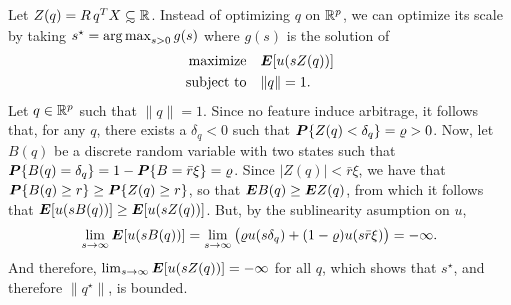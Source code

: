 Let $Z(q)=R\,q^TX\subsetsim\real$. Instead of optimizing $q$ on $\mathbb{R}^p$, we can optimize
its scale by taking $s^\star = \operatorname*{arg\,max}_{s>0}g(s)$ where $g(s)$ is the solution of
\begin{align*}
  \maximizeEquationSt{\E[u(sZ(q))]}[\|q\|= 1].
\end{align*}
Let $q\in\mathbb{R}^p$ such that $\|q\|=1$. Since no feature induce arbitrage, it follows that,
for any $q$, there exists a $\delta_q<0$ such that $\bm P\{Z(q)<\delta_q\}=\varrho>0$. Now,
let $B(q)$ be a discrete random variable with two states such that
$\bm P\{B(q)=\delta_q\}=1-\bm P\{B=\bar r\xi\}=\varrho$. Since $|Z(q)|<\bar r\xi$, we have
that $\bm P\{B(q)\geq r\} \geq \bm P\{Z(q)\geq r\}$, so that $\bm E B(q) \geq \bm E Z(q)$, from which
it follows that $\bm E[u(sB(q))]\geq \bm E[u(sZ(q))]$. But, by the sublinearity asumption on
$u$, 
\[
  \lim_{s\to\infty}\bm E[u(sB(q))] = \lim_{s\to\infty}\big(\varrho
  u(s\delta_q)+(1-\varrho)u(s\bar r\xi)\big) = -\infty.
\]
And therefore, $\lim_{s\to\infty}\bm E[u(sZ(q))]=-\infty$ for all $q$, which shows that
$s^\star$, and therefore $\|q^\star\|$, is bounded.


